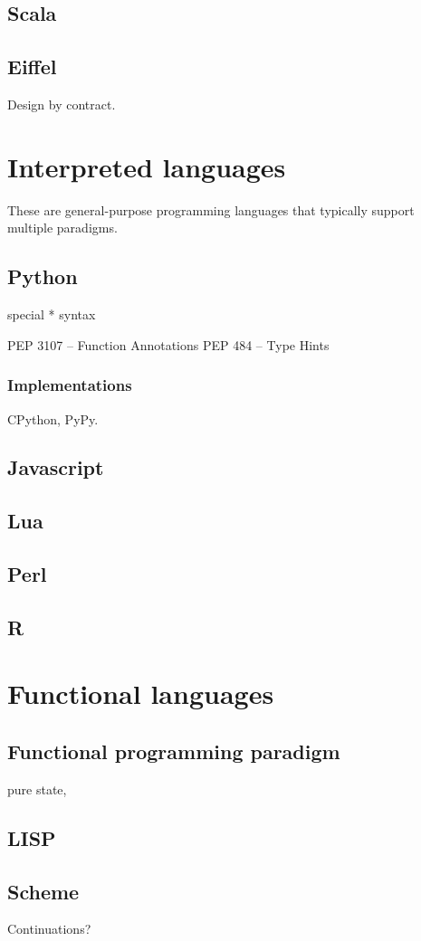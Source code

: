 \subsection{Scala}

\subsection{Eiffel}
Design by contract.

\section{Interpreted languages}
These are general-purpose programming languages that typically support multiple paradigms.
\subsection{Python}
special * syntax

 PEP 3107 -- Function Annotations
 PEP 484 -- Type Hints
\subsubsection{Implementations}
CPython, PyPy.
\subsection{Javascript}
\subsection{Lua}
\subsection{Perl}
\subsection{R}


\section{Functional languages}
\subsection{Functional programming paradigm}
pure state, 
\subsection{LISP}
\subsection{Scheme}
Continuations?
